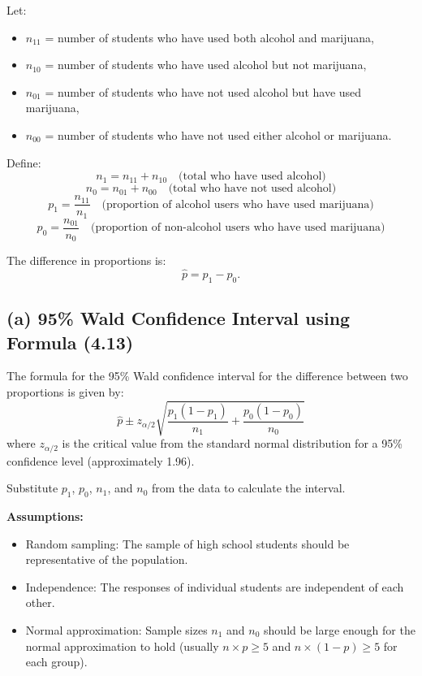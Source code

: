 \documentclass{article}
\begin{document}
Let:
\begin{itemize}
    \item \( n_{11} \) = number of students who have used both alcohol and marijuana,
    \item \( n_{10} \) = number of students who have used alcohol but not marijuana,
    \item \( n_{01} \) = number of students who have not used alcohol but have used marijuana,
    \item \( n_{00} \) = number of students who have not used either alcohol or marijuana.
\end{itemize}

Define:
\[
n_1 = n_{11} + n_{10} \quad \text{(total who have used alcohol)}
\]
\[
n_0 = n_{01} + n_{00} \quad \text{(total who have not used alcohol)}
\]
\[
p_1 = \frac{n_{11}}{n_1} \quad \text{(proportion of alcohol users who have used marijuana)}
\]
\[
p_0 = \frac{n_{01}}{n_0} \quad \text{(proportion of non-alcohol users who have used marijuana)}
\]

The difference in proportions is:
\[
\hat{p} = p_1 - p_0.
\]

\subsection*{(a) 95\% Wald Confidence Interval using Formula (4.13)}

The formula for the 95\% Wald confidence interval for the difference between two proportions is given by:
\[
\hat{p} \pm z_{\alpha/2} \sqrt{\frac{p_1(1 - p_1)}{n_1} + \frac{p_0(1 - p_0)}{n_0}}
\]
where \( z_{\alpha/2} \) is the critical value from the standard normal distribution for a 95\% confidence level (approximately 1.96).

Substitute \( p_1 \), \( p_0 \), \( n_1 \), and \( n_0 \) from the data to calculate the interval.

\textbf{Assumptions:}
\begin{itemize}
    \item Random sampling: The sample of high school students should be representative of the population.
    \item Independence: The responses of individual students are independent of each other.
    \item Normal approximation: Sample sizes \( n_1 \) and \( n_0 \) should be large enough for the normal approximation to hold (usually \( n \times p \geq 5 \) and \( n \times (1 - p) \geq 5 \) for each group).
\end{itemize}
\end{document}
